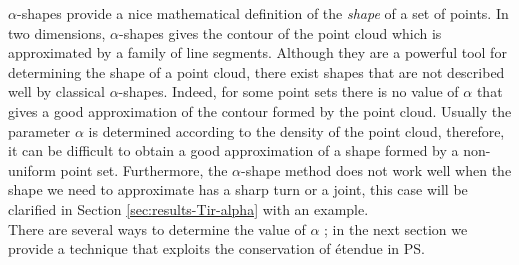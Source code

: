 $\alpha$-shapes provide a nice mathematical definition of the \textit{shape} of
a set of points. In two dimensions, $\alpha$-shapes gives the contour of the point cloud which is approximated by a family of line segments. 
Although they are a powerful tool for determining the shape of a point cloud, there exist shapes that are not described well by classical $ \alpha $-shapes. Indeed, for some point sets there is no value of $\alpha$ that gives a good approximation of the contour formed by the point cloud. Usually the parameter $\alpha$ is determined according to the density of the point cloud, therefore, it can be difficult to obtain a good approximation of a shape formed by a non-uniform point set. Furthermore, the $\alpha$-shape method does not work well when the shape we need to approximate has a sharp turn or a joint, this case will be clarified in Section \ref{sec:results-Tir-alpha} with an example. 
\\ \indent There are several ways to determine the value of $\alpha$ \cite{mandal1997selection}; in the next section we provide a technique that exploits the conservation of \'{e}tendue in PS. 
